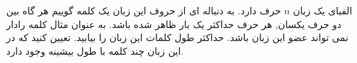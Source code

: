 \exercise
الفبای یک زبان
$n$
حرف دارد. به دنباله ای از حروف این زبان یک کلمه گوییم هر گاه بین دو حرف یکسان, هر حرف حداکثر یک بار ظاهر شده باشد. به عنوان مثال کلمه رادار نمی تواند عضو این زبان باشد. حداکثر طول کلمات این زبان را بیابید. تعیین کنید که در این زبان چند کلمه با طول بیشینه وجود دارد.